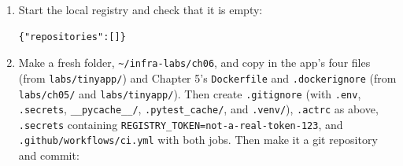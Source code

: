 \begin{enumerate}
\def\labelenumi{\arabic{enumi}.}
\item
  Start the local registry and check that it is empty:

  \begin{codeblock}

\begin{Shaded}
\begin{Highlighting}[]
 
\end{Highlighting}
\end{Shaded}

  \end{codeblock}

  \begin{codeblock}
  \begin{Verbatim}[formatcom=\outputstyle]
  {"repositories":[]}
  \end{Verbatim}
  \end{codeblock}
\item
  Make a fresh folder, \texttt{\textasciitilde{}/infra-labs/ch06}, and copy in the app's four files (from \texttt{labs/tinyapp/}) and Chapter 5's \texttt{Dockerfile} and \texttt{.dockerignore} (from \texttt{labs/ch05/} and \texttt{labs/tinyapp/}). Then create \texttt{.gitignore} (with \texttt{.env}, \texttt{.secrets}, \texttt{\_\_pycache\_\_/}, \texttt{.pytest\_cache/}, and \texttt{.venv/}), \texttt{.actrc} as above, \texttt{.secrets} containing \texttt{REGISTRY\_}\allowbreak{}\texttt{TOKEN=}\allowbreak{}\texttt{not-}\allowbreak{}\texttt{a-}\allowbreak{}\texttt{real-}\allowbreak{}\texttt{token-}\allowbreak{}\texttt{123}, and \texttt{.}\allowbreak{}\texttt{github/}\allowbreak{}\texttt{workflows/}\allowbreak{}\texttt{ci.}\allowbreak{}\texttt{yml} with both jobs. Then make it a git repository and commit:

  \begin{codeblock}

\begin{Shaded}
\begin{Highlighting}[]
 
\end{Highlighting}
\end{Shaded}


\end{codeblock}
\end{enumerate}
